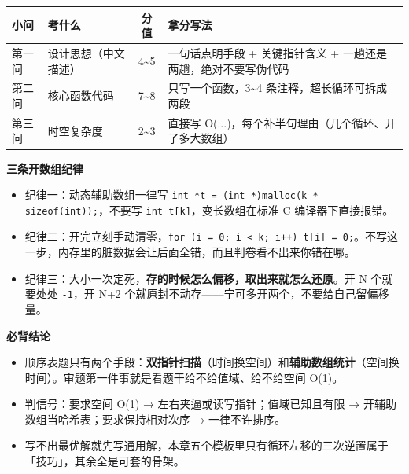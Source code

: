 \documentclass[10pt,a4paper]{ctexart}
\begin{document}
\begin{center}\small
\begin{tabularx}{\linewidth}{@{}l>{\raggedright\arraybackslash}Xc>{\raggedright\arraybackslash}X@{}}
\toprule
小问 & 考什么 & 分值 & 拿分写法 \\
\midrule
第一问 & 设计思想（中文描述） & 4\textasciitilde{}5 & 一句话点明手段 + 关键指针含义 + 一趟还是两趟，绝对不要写伪代码 \\
第二问 & 核心函数代码 & 7\textasciitilde{}8 & 只写一个函数，3\textasciitilde{}4 条注释，超长循环可拆成两段 \\
第三问 & 时空复杂度 & 2\textasciitilde{}3 & 直接写 O(...)，每个补半句理由（几个循环、开了多大数组） \\
\bottomrule
\end{tabularx}
\end{center}

\textbf{三条开数组纪律}

\begin{itemize}

\item 纪律一：动态辅助数组一律写 \texttt{int *t = (int *)malloc(k * sizeof(int));}，不要写 \texttt{int t[k]}，变长数组在标准 C 编译器下直接报错。

\item 纪律二：开完立刻手动清零，\texttt{for (i = 0; i < k; i++) t[i] = 0;}。不写这一步，内存里的脏数据会让后面全错，而且判卷看不出来你错在哪。

\item 纪律三：大小一次定死，\textbf{存的时候怎么偏移，取出来就怎么还原}。开 N 个就要处处 \texttt{-1}，开 N+2 个就原封不动存——宁可多开两个，不要给自己留偏移量。

\end{itemize}




\textbf{必背结论}

\begin{itemize}

\item 顺序表题只有两个手段：\textbf{双指针扫描}（时间换空间）和\textbf{辅助数组统计}（空间换时间）。审题第一件事就是看题干给不给值域、给不给空间 O(1)。

\item 判信号：要求空间 O(1) → 左右夹逼或读写指针；值域已知且有限 → 开辅助数组当哈希表；要求保持相对次序 → 一律不许排序。

\item 写不出最优解就先写通用解，本章五个模板里只有循环左移的三次逆置属于「技巧」，其余全是可套的骨架。

\end{itemize}
\end{document}
